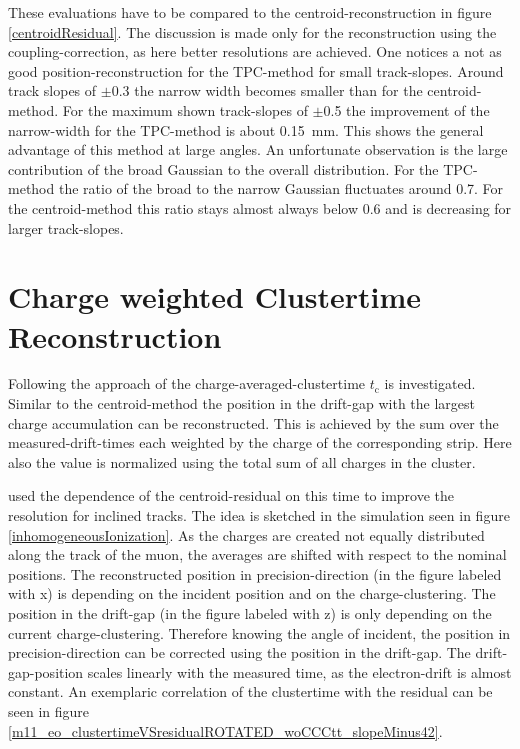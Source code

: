 \documentclass[
twoside,            %
BCOR1.4cm,          %
10pt,               %
headings=normal,    %
headsepline,        %
clearplainpage,		%
final,              %
div=14,
open=right,
bibliography=toc
]{scrreprt}
\begin{document}
These evaluations have to be compared to the centroid-reconstruction in figure \ref{centroidResidual}.
The discussion is made only for the reconstruction using the coupling-correction, as here better resolutions are achieved.
One notices a not as good position-reconstruction for the \textmu TPC-method for small track-slopes.
Around track slopes of $\pm$0.3 the narrow width becomes smaller than for the centroid-method.
For the maximum shown track-slopes of $\pm$0.5 the improvement of the narrow-width for the \textmu TPC-method is about \SI{0.15}{mm}.
This shows the general advantage of this method at large angles.
An unfortunate observation is the large contribution of the broad Gaussian to the overall distribution.
For the \textmu TPC-method the ratio of the broad to the narrow Gaussian fluctuates around 0.7.
For the centroid-method this ratio stays almost always below 0.6 and is decreasing for larger track-slopes.

\section{Charge weighted Clustertime Reconstruction}

Following the approach of \cite{flierlThesis} the charge-averaged-clustertime $t_{\mathrm{c}}$ is investigated.
Similar to the centroid-method the position in the drift-gap with the largest charge accumulation can be reconstructed.
This is achieved by the sum over the measured-drift-times each weighted by the charge of the corresponding strip.
Here also the value is normalized using the total sum of all charges in the cluster.

\cite{flierlThesis} used the dependence of the centroid-residual on this time to improve the resolution for inclined tracks.
The idea is sketched in the simulation seen in figure \ref{inhomogeneousIonization}.
As the charges are created not equally distributed along the track of the muon, the averages are shifted with respect to the nominal positions.
The reconstructed position in precision-direction (in the figure labeled with x) is depending on the incident position and on the charge-clustering. 
The position in the drift-gap (in the figure labeled with z) is only depending on the current charge-clustering.
Therefore knowing the angle of incident, the position in precision-direction can be corrected using the position in the drift-gap.
The drift-gap-position scales linearly with the measured time, as the electron-drift is almost constant.
An exemplaric correlation of the clustertime with the residual can be seen in figure \ref{m11_eo_clustertimeVSresidualROTATED_woCCCtt_slopeMinus42}.
\end{document}
